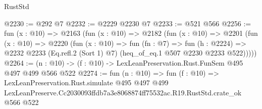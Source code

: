 \begin{lexlean}{RustStd}
\begin{coremodule}
@2230 := @292 @7
@2232 := @2229 @2230 @7
@2233 := @521 @566
@2256 := fun (x : @10) =>
  @2163
    (fun (x : @10) =>
    @2182
      (fun (x : @10) =>
      @2201
        (fun (x : @10) =>
        @2220
          (fun (x : @10) =>
          fun (fn : @7) =>
          fun (h : @2224) =>
          @2232 @2233 (Eq.refl.{2} (Sort 1) @7) (heq_of_eq.{1} @507 @2230 @2233 @522)))))
@2264 := (n : @10) -> (f : @10) -> LexLeanPreservation.Rust.FunSem @495 @497 @499 @566 @522
@2274 := fun (n : @10) =>
  fun (f : @10) =>
  LexLeanPreservation.Rust.simulate
    @495
    @497
    @499
    LexLeanPreserve.Cc2030093ffdb7a3e8068874ff75532ac.R19.RustStd.crate_ok
    @566
    @522
\end{coremodule}
\end{lexlean}
